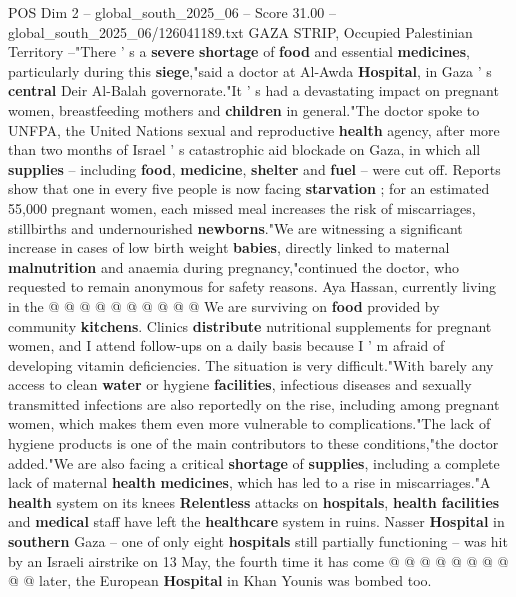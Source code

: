 \begin{textsample}{POS Dim 2 – global\_south\_2025\_06 – Score 31.00 – global\_south\_2025\_06/126041189.txt}  \label{ex:f2_pos_084}
GAZA STRIP, Occupied Palestinian Territory --"There ' s a \textbf{severe} \textbf{shortage} of \textbf{food} and essential \textbf{medicines}, particularly during this \textbf{siege},"said a doctor at Al-Awda \textbf{Hospital}, in Gaza ' s \textbf{central} Deir Al-Balah governorate."It ' s had a devastating impact on pregnant women, breastfeeding mothers and \textbf{children} in general."The doctor spoke to UNFPA, the United Nations sexual and reproductive \textbf{health} agency, after more than two months of Israel ' s catastrophic aid blockade on Gaza, in which all \textbf{supplies} -- including \textbf{food}, \textbf{medicine}, \textbf{shelter} and \textbf{fuel} -- were cut off.
Reports show that one in every five people is now facing \textbf{starvation} ; for an estimated 55,000 pregnant women, each missed meal increases the risk of miscarriages, stillbirths and undernourished \textbf{newborns}."We are witnessing a significant increase in cases of low birth weight \textbf{babies}, directly linked to maternal \textbf{malnutrition} and anaemia during pregnancy,"continued the doctor, who requested to remain anonymous for safety reasons.
Aya Hassan, currently living in the @ @ @ @ @ @ @ @ @ @ We are surviving on \textbf{food} provided by community \textbf{kitchens}.
Clinics \textbf{distribute} nutritional supplements for pregnant women, and I attend follow-ups on a daily basis because I ' m afraid of developing vitamin deficiencies.
The situation is very difficult."With barely any access to clean \textbf{water} or hygiene \textbf{facilities}, infectious diseases and sexually transmitted infections are also reportedly on the rise, including among pregnant women, which makes them even more vulnerable to complications."The lack of hygiene products is one of the main contributors to these conditions,"the doctor added."We are also facing a critical \textbf{shortage} of \textbf{supplies}, including a complete lack of maternal \textbf{health} \textbf{medicines}, which has led to a rise in miscarriages."A \textbf{health} system on its knees \textbf{Relentless} attacks on \textbf{hospitals}, \textbf{health} \textbf{facilities} and \textbf{medical} staff have left the \textbf{healthcare} system in ruins.
Nasser \textbf{Hospital} in \textbf{southern} Gaza -- one of only eight \textbf{hospitals} still partially functioning -- was hit by an Israeli airstrike on 13 May, the fourth time it has come @ @ @ @ @ @ @ @ @ @ later, the European \textbf{Hospital} in Khan Younis was bombed too.

\end{textsample}
